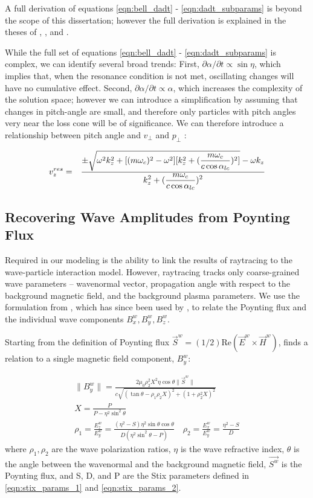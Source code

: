 A full derivation of equations \eqref{eqn:bell_dadt} - \eqref{eqn:dadt_subparams} is beyond the scope of this dissertation; however the full derivation is explained in the theses of \cite{Bortnik2005}, \cite{Ristic1993}, and \cite{Bell1984}.

While the full set of equations \eqref{eqn:bell_dadt} - \eqref{eqn:dadt_subparams} is complex, we can identify several broad trends: First, $\partial \alpha / \partial t \propto \sin \eta$, which implies that, when the resonance condition is not met, oscillating changes will have no cumulative effect. Second, $\partial \alpha / \partial t \propto \alpha$, which increases the complexity of the solution space; however we can introduce a simplification by assuming that changes in pitch-angle are small, and therefore only particles with pitch angles very near the loss cone will be of significance. We can therefore introduce a relationship between pitch angle and $v_\perp$ and $p_\perp$ \citep{Bortnik2006}:

\begin{eqnarray}
v_z^{res} & = & \frac{\displaystyle \pm \sqrt{\omega^2 k_z^2 + [(m \omega_c)^2 - \omega^2] [k_z^2 + (\frac{m \omega_c}{c \cos \alpha_{lc}})^2]} - \omega k_z}{\displaystyle k_z^2 + (\frac{m \omega_c}{c \cos \alpha_{lc}})^2}
\end{eqnarray}

\subsection{Recovering Wave Amplitudes from Poynting Flux}
Required in our modeling is the ability to link the results of raytracing to the wave-particle interaction model. However, raytracing tracks only coarse-grained wave parameters -- wavenormal vector, propagation angle with respect to the background magnetic field, and the background plasma parameters. We use the formulation from \cite{Bell1984}, which has since been used by \cite{Ristic1993, Lauben1998, Bortnik2006}, to relate the Poynting flux and the individual wave components $B_x^w, B_y^w, B_z^w$.

Starting from the definition of Poynting flux $\vec{S}^w = (1/2) \mathrm{Re}(\vec{E}^w\times\vec{H}^w)$, \cite{Bell1984} finds a relation to a single magnetic field component, $B_y^w$:

\begin{gather}
\|B_y^w\| =  \frac{2\mu_0\rho_2^2 X^2 \eta \cos\theta \|\vec{S}^w\|}{c\sqrt{(\tan\theta - \rho_1 \rho_2 X)^2 + (1 + \rho_2^2 X)^2}} \\
X = \frac{P}{P - \eta^2\sin^2\theta} \\
\rho_1 = \frac{E_z^w}{E_y^w} = \frac{(\eta^2 - S) \eta^2 \sin\theta\cos\theta}{D (\eta^2 \sin^2 \theta - P)} \quad \rho_2 = \frac{E_x^w}{E_y^w} = \frac{\eta^2 - S}{D}
\end{gather}
\noindent where $\rho_1, \rho_2$ are the wave polarization ratios, $\eta$ is the wave refractive index, $\theta$ is the angle between the wavenormal and the background magnetic field, $\vec{S^w}$ is the Poynting flux, and S, D, and P are the Stix parameters defined in \eqref{eqn:stix_params_1} and \eqref{eqn:stix_params_2}.

